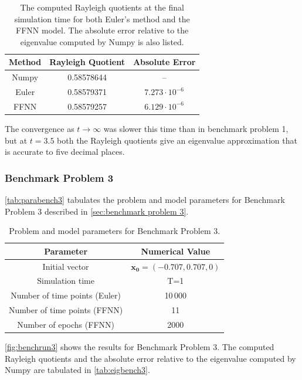 \begin{table}[H]
\caption{The computed Rayleigh quotients at the final simulation time for both Euler's method and the FFNN model. The absolute error relative to the eigenvalue computed by Numpy is also listed.}
\centering
{}
\begin{tabular}{c|c|c}
\hline
\hline 
Method & Rayleigh Quotient & Absolute Error
\\
\hline 
\hline 
Numpy & 0.58578644 & –
\\
Euler & 0.58579371 & $7.273 \cdot 10^{-6}$  
\\
FFNN & 0.58579257 & $6.129 \cdot 10^{-6}$
\\
\hline
\hline 
\end{tabular}
\label{tab:eigbench2}
\end{table}

The convergence as $t\to\infty$ was slower this time than in benchmark problem 1, but at $t=3.5$ both the Rayleigh quotients give an eigenvalue approximation that is accurate to five decimal places.

\subsubsection{Benchmark Problem 3}

\autoref{tab:parabench3} tabulates the problem and model parameters for Benchmark Problem 3 described in \autoref{sec:benchmark problem 3}. 

\begin{table}[H]
\caption{Problem and model parameters for Benchmark Problem 3.}
\centering
{}
\begin{tabular}{c|c}
\hline
\hline 
Parameter & Numerical Value
\\
\hline 
\hline 
Initial vector & $\bm{x_0}=(-0.707, 0.707, 0)$
\\
Simulation time & T=1
\\
Number of time points (Euler) & 10\,000
\\
Number of time points (FFNN) & 11
\\
Number of epochs (FFNN) & 2000
\\
\hline
\hline 
\end{tabular}
\label{tab:parabench3}
\end{table}


\autoref{fig:benchrun3} shows the results for Benchmark Problem 3. The computed Rayleigh quotients and the absolute error relative to the eigenvalue computed by Numpy are tabulated in \autoref{tab:eigbench3}.


